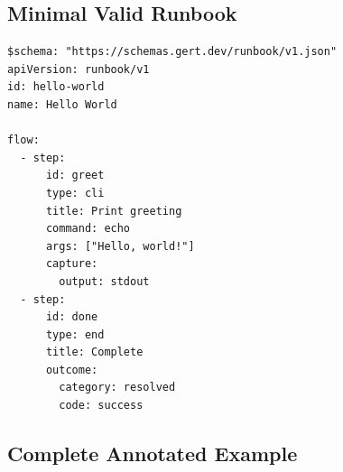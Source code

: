 \subsection{Minimal Valid Runbook}
\label{subsec:minimal-runbook}

\begin{verbatim}
$schema: "https://schemas.gert.dev/runbook/v1.json"
apiVersion: runbook/v1
id: hello-world
name: Hello World

flow:
  - step:
      id: greet
      type: cli
      title: Print greeting
      command: echo
      args: ["Hello, world!"]
      capture:
        output: stdout
  - step:
      id: done
      type: end
      title: Complete
      outcome:
        category: resolved
        code: success
\end{verbatim}

\subsection{Complete Annotated Example}
\label{subsec:full-example}

